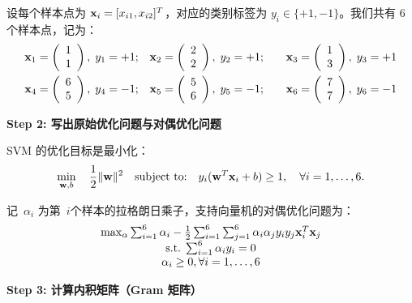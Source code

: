 设每个样本点为 ${\bf x}_i = [x_{i1}, x_{i2}]^T$，对应的类别标签为 $y_i \in \{+1, -1\}$。我们共有 6 个样本点，记为：
\[
\begin{aligned}
{\bf x}_1 = \left(
\begin{array}{c} 
1 \\ 
1 
\end{array}\right),\;  y_1 = +1;  & \quad {\bf x}_2 = \left(
\begin{array}{c} 
2 \\ 
2 
\end{array}\right), \;  y_2 = +1 ; & \quad{\bf x}_3 =  \left(
\begin{array}{c} 
1 \\ 
3 
\end{array}\right),\;  y_3 = +1 \\
{\bf x}_4 =  \left(
\begin{array}{c} 
6 \\ 
5 
\end{array}\right), \; y_4 = -1 ; &\quad {\bf x}_5 =  \left(
\begin{array}{c} 
5 \\ 
6 
\end{array}\right),\; y_5 = -1 ; &\quad {\bf x}_6 = \left(
\begin{array}{c} 
7 \\ 
7 
\end{array}\right),\; y_6 = -1 
\end{aligned}
\]

\vspace{0.5em}
\textbf{Step 2: 写出原始优化问题与对偶优化问题}

SVM 的优化目标是最小化：
\[
\min_{{\bf w}, b} \quad \frac{1}{2}\|{\bf w}\|^2
\quad \text{subject to:} \quad y_i({\bf w}^T {\bf x}_i + b) \geq 1,\quad \forall i = 1,\dots,6.
\]

记~$ \alpha_i $ 为第~$i$个样本的拉格朗日乘子，支持向量机的对偶优化问题为：
\begin{equation}\label{ex_opt}
\begin{array}{c}
{\rm max}_{\alpha} \sum_{i=1}^6 \alpha_i -\frac{1}{2} \sum_{i=1}^6 \sum_{j=1}^6 \alpha_i \alpha_j y_i y_j {\bf x}_i^T {\bf x}_j \\
{\rm s.t.} \;  \sum_{i=1}^6 \alpha_i y_i =0 \\
\alpha_i \ge 0, \forall i=1, \dots, 6 
   \end{array}
\end{equation}

\vspace{0.5em}
\textbf{Step 3: 计算内积矩阵（Gram 矩阵）}

